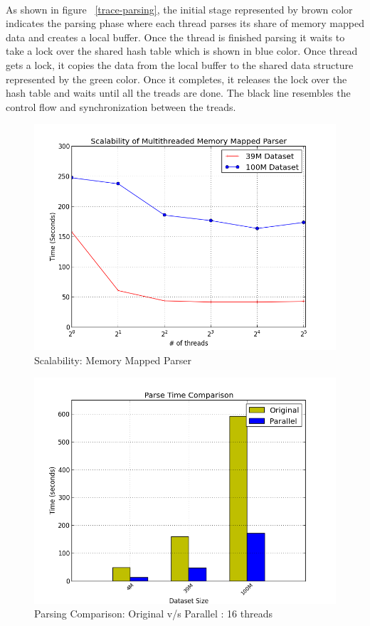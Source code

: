 \label{key}\documentclass[bachinf, english ,zihtitle,final,hyperref,utf8]{zihpub}
\begin{document}
\paragraph{}
As shown in figure ~\ref{trace-parsing}, the initial stage represented by brown color indicates the parsing phase where each thread parses its share of memory mapped data and creates a local buffer. Once the thread is finished parsing it waits to take a lock over the shared hash table which is shown in blue color. Once thread gets a lock, it copies the data from the local buffer to the shared data structure represented by the green color. Once it completes, it releases the lock over the hash table and waits until all the treads are done. The black line resembles the control flow and synchronization between the treads. 
\begin{figure}[h]
\center
\includegraphics[scale=0.4]{scale_parse}
\caption{Scalability: Memory Mapped Parser}
\label{scale-parser}
\end{figure}
\begin{figure}
\center
\includegraphics[scale=0.4]{Parse_compare}
\caption{Parsing Comparison: Original v/s Parallel : 16 threads}
\label{compare-parser}
\end{figure}
\end{document}
